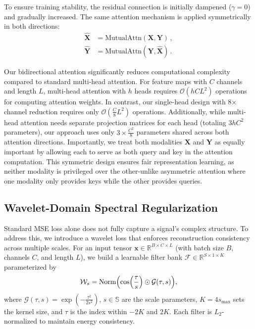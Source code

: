\documentclass[conference]{IEEEtran}
\begin{document}
To ensure training stability, the residual connection is initially dampened ($\gamma=0$) and gradually increased. The same attention mechanism is applied symmetrically in both directions:
\begin{equation}
    \begin{aligned}
        \widehat{\mathbf{X}} & = \text{MutualAttn}(\mathbf{X}, \mathbf{Y})\,,           \\
        \widehat{\mathbf{Y}} & = \text{MutualAttn}(\mathbf{Y}, \widehat{\mathbf{X}})\,.
    \end{aligned}
\end{equation}

Our bidirectional attention significantly reduces computational complexity compared to standard multi-head attention. For feature maps with $C$ channels and length $L$, multi-head attention with $h$ heads requires $\mathcal{O}(hCL^2)$ operations for computing attention weights. In contrast, our single-head design with 8× channel reduction requires only $\mathcal{O}(\frac{C}{8}L^2)$ operations. Additionally, while multi-head attention needs separate projection matrices for each head (totaling $3hC^2$ parameters), our approach uses only $3 \times \frac{C^2}{8}$ parameters shared across both attention directions. Importantly, we treat both modalities $\mathbf{X}$ and $\mathbf{Y}$ as equally important by allowing each to serve as both query and key in the attention computation. This symmetric design ensures fair representation learning, as neither modality is privileged over the other-unlike asymmetric attention where one modality only provides keys while the other provides queries. 



\subsection{Wavelet-Domain Spectral Regularization}
\label{subsec:wavelet}

Standard MSE loss alone does not fully capture a signal's complex structure. To address this, we introduce a wavelet loss that enforces reconstruction consistency across multiple scales. For an input tensor $\mathbf{x}\in\mathbb{R}^{B\times C\times L}$ (with batch size $B$, channels $C$, and length $L$), we build a learnable filter bank $\mathcal{F}\in\mathbb{R}^{S\times 1\times K}$ parameterized by
\begin{equation}
    \label{eq:wavelet}
    \mathcal{W}_s = \operatorname{Norm}\Bigl(\cos\Bigl(\frac{\tau}{s}\Bigr) \odot \mathcal{G}(\tau,s)\Bigr),
\end{equation}
where $\mathcal{G}(\tau,s)=\exp\left(-\frac{\tau^2}{2s^2}\right)$, $s\in\mathbb{S}$ are the scale parameters, $K=4s_{\text{max}}$ sets the kernel size, and $\tau$ is the index within $-2K$ and $2K$. Each filter is $L_2$-normalized to maintain energy consistency.
\end{document}
